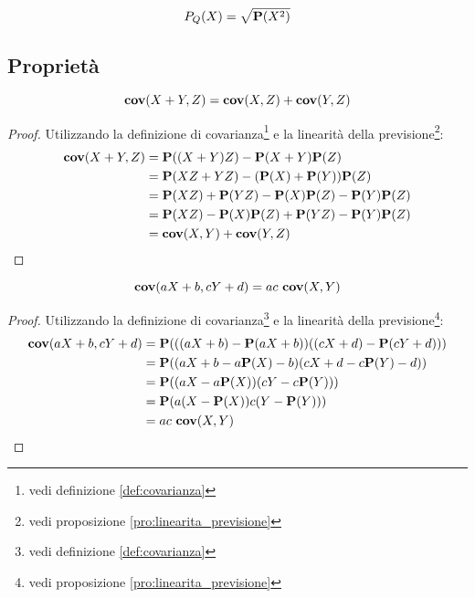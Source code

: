 \begin{definition}\label{def:previsione_quadratica}
  \[ P_Q(X) = \sqrt{\mathbf{P}(X^2)} \]
\end{definition}


\subsection{Proprietà}
\begin{proposition}\label{def:bilinearita_della_covarianza}
  \[ \mathbf{cov}(X+Y,Z) = \mathbf{cov}(X,Z) + \mathbf{cov}(Y,Z) \]
\end{proposition}

\begin{proof}
  Utilizzando la definizione di covarianza\footnote{vedi definizione \ref{def:covarianza}} e la linearità della previsione\footnote{vedi proposizione \ref{pro:linearita_previsione}}:
  \begin{align*}
    \mathbf{cov}(X + Y,Z) &= \mathbf{P}((X+Y)Z) - \mathbf{P}(X+Y)\mathbf{P}(Z) \\
    &= \mathbf{P}(XZ + YZ) - (\mathbf{P}(X)+\mathbf{P}(Y))\mathbf{P}(Z) \\
    &= \mathbf{P}(XZ) + \mathbf{P}(YZ) - \mathbf{P}(X)\mathbf{P}(Z) - \mathbf{P}(Y)\mathbf{P}(Z) \\
    &= \mathbf{P}(XZ) - \mathbf{P}(X)\mathbf{P}(Z) + \mathbf{P}(YZ) - \mathbf{P}(Y)\mathbf{P}(Z) \\
    &= \mathbf{cov}(X,Y) + \mathbf{cov}(Y,Z)
  \end{align*}
\end{proof}

\begin{proposition}
  \label{pro:trasformazione_lineare_covarianza}
  \[ \mathbf{cov}(aX + b, cY + d) = ac ~ \mathbf{cov}(X,Y) \]
\end{proposition}

\begin{proof}
  Utilizzando la definizione di covarianza\footnote{vedi definizione \ref{def:covarianza}} e la linearità della previsione\footnote{vedi proposizione \ref{pro:linearita_previsione}}:
  \begin{align*}
    \mathbf{cov}(aX + b, cY + d) &= \mathbf{P}(((aX + b) - \mathbf{P}(aX + b))((cX + d) - \mathbf{P}(cY + d))) \\
    &= \mathbf{P}((aX + b - a\mathbf{P}(X) - b)(cX + d - c\mathbf{P}(Y) - d)) \\
    &= \mathbf{P}((aX - a\mathbf{P}(X))(cY - c\mathbf{P}(Y))) \\
    &= \mathbf{P}(a(X - \mathbf{P}(X)) c(Y - \mathbf{P}(Y))) \\
    &= ac ~ \mathbf{cov}(X,Y)
  \end{align*}
\end{proof}

